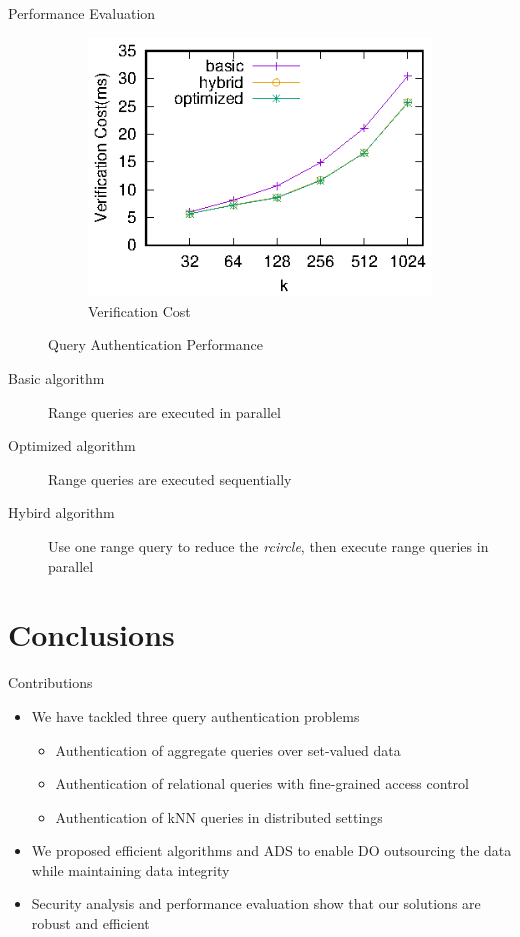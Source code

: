\documentclass[xcolor={dvipsnames},aspectratio=169,10pt]{beamer}
\begin{document}
\begin{frame}{Performance Evaluation}
\begin{figure}
\begin{subfigure}[t]{.33\linewidth}
      \includegraphics[width=\linewidth]{exp-figs/knn/verify.eps}
      \caption{Verification Cost}
    \end{subfigure}
    \caption{Query Authentication Performance}
  \end{figure}

  \small
  \begin{description}
    \item[Basic algorithm] Range queries are executed \alert{in parallel}
    \item[Optimized algorithm] Range queries are executed \alert{sequentially}
    \item[Hybird algorithm] Use \alert{one range query} to reduce the \emph{rcircle}, then execute range queries \alert{in parallel}
  \end{description}
\end{frame}

\section{Conclusions}

\begin{frame}{Contributions}
  \begin{itemize}
    \item We have tackled three query authentication problems
      \begin{itemize}
        \item Authentication of aggregate queries over set-valued data
        \item Authentication of relational queries with fine-grained access control
        \item Authentication of kNN queries in distributed settings
      \end{itemize}
    \item We proposed efficient algorithms and ADS to enable DO outsourcing the data while maintaining data integrity
    \item Security analysis and performance evaluation show that our solutions are robust and efficient
  \end{itemize}
\end{frame}
\end{document}
